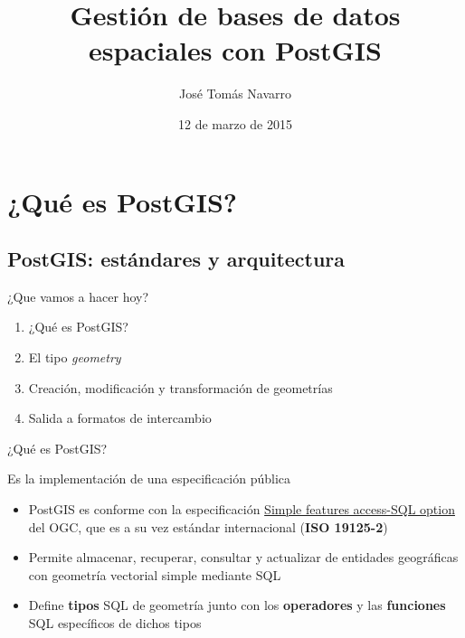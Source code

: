 \documentclass{classes/beamer_GeomaticaUA}
\author{José Tomás Navarro}
\title{Gestión de bases de datos espaciales con PostGIS}
\institute[GeomaticaLab]{Instituto Interuniversitario de Geografía\\Laboratorio de Geomática}
\date{12 de marzo de 2015}
\begin{document}
\begin{frame}
\titlepage
\end{frame}

\section[Introducción]{¿Qué es PostGIS?}
\subsection{PostGIS: estándares y arquitectura}
\begin{frame}{¿Que vamos a hacer hoy?}

\begin{enumerate}
\item ¿Qué es PostGIS?
\item El tipo \textit{geometry}
\item Creación, modificación y transformación de geometrías
\item Salida a formatos de intercambio
\end{enumerate}
\end{frame}

\begin{frame}{¿Qué es PostGIS?}
\begin{block}{Es la implementación de una especificación pública}
\begin{itemize}
\item PostGIS es conforme con la especificación \href{http://www.opengeospatial.org/standards/sfs}{Simple features access-SQL option} del OGC, que es a su vez estándar internacional (\textbf{ISO 19125-2})
\item Permite almacenar, recuperar, consultar y actualizar de entidades geográficas con geometría vectorial simple mediante SQL
\item Define \textbf{tipos} SQL de geometría junto con los \textbf{operadores} y las \textbf{funciones} SQL específicos de dichos tipos
\end{itemize}
\end{block}
\end{frame}
\end{document}
